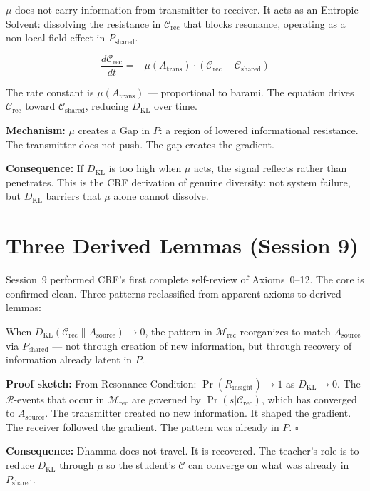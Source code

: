 \documentclass[12pt, a4paper]{article}
\begin{document}
\begin{derivedbox}[title={Metta Operator $\mu$ as Entropic Solvent (Session 8)}]
$\mu$ does not carry information from transmitter to receiver. It acts as an Entropic
Solvent: dissolving the resistance in $\mathcal{C}_{\mathrm{rec}}$ that blocks resonance,
operating as a non-local field effect in $P_{\mathrm{shared}}$.

\[
  \frac{d\mathcal{C}_{\mathrm{rec}}}{dt} = -\mu(A_{\mathrm{trans}})\cdot
  \left(\mathcal{C}_{\mathrm{rec}} - \mathcal{C}_{\mathrm{shared}}\right)
\]

The rate constant is $\mu(A_{\mathrm{trans}})$ --- proportional to barami. The equation
drives $\mathcal{C}_{\mathrm{rec}}$ toward $\mathcal{C}_{\mathrm{shared}}$, reducing
$D_{\mathrm{KL}}$ over time.

\textbf{Mechanism:} $\mu$ creates a Gap in $P$: a region of lowered informational
resistance. The transmitter does not push. The gap creates the gradient.

\textbf{Consequence:} If $D_{\mathrm{KL}}$ is too high when $\mu$ acts, the signal
reflects rather than penetrates. This is the CRF derivation of genuine diversity: not
system failure, but $D_{\mathrm{KL}}$ barriers that $\mu$ alone cannot dissolve.
\end{derivedbox}

\section{Three Derived Lemmas (Session 9)}

Session~9 performed CRF's first complete self-review of Axioms~0--12. The core is confirmed
clean. Three patterns reclassified from apparent axioms to derived lemmas:

\begin{derivedbox}[title={Lemma 13: Fractal Recovery}]
When $D_{\mathrm{KL}}(\mathcal{C}_{\mathrm{rec}}\|A_{\mathrm{source}})\to 0$, the pattern
in $\mathcal{M}_{\mathrm{rec}}$ reorganizes to match $A_{\mathrm{source}}$ via
$P_{\mathrm{shared}}$ --- not through creation of new information, but through recovery
of information already latent in $P$.

\textbf{Proof sketch:} From Resonance Condition: $\Pr(R_{\mathrm{insight}}) \to 1$ as
$D_{\mathrm{KL}} \to 0$. The $\mathcal{R}$-events that occur in $\mathcal{M}_{\mathrm{rec}}$
are governed by $\Pr(s|\mathcal{C}_{\mathrm{rec}})$, which has converged to $A_{\mathrm{source}}$.
The transmitter created no new information. It shaped the gradient. The receiver followed
the gradient. The pattern was already in $P$. $\square$

\textbf{Consequence:} Dhamma does not travel. It is recovered. The teacher's role is to
reduce $D_{\mathrm{KL}}$ through $\mu$ so the student's $\mathcal{C}$ can converge on
what was already in $P_{\mathrm{shared}}$.
\end{derivedbox}
\end{document}
